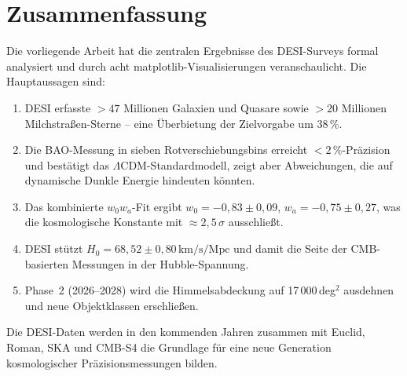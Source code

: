 ﻿\documentclass[a4paper,12pt]{article}
\theoremstyle{definition}
\theoremstyle{remark}
\begin{document}
\section{Zusammenfassung}
\label{sec:zusammenfassung}

Die vorliegende Arbeit hat die zentralen Ergebnisse des DESI-Surveys formal
analysiert und durch acht matplotlib-Visualisierungen veranschaulicht.
Die Hauptaussagen sind:

\begin{enumerate}[label=\arabic*.]
  \item DESI erfasste $>47$ Millionen Galaxien und Quasare sowie $>20$ Millionen
    Milchstra\-ßen-Sterne -- eine Überbietung der Zielvorgabe um 38\,\%.
  \item Die BAO-Messung in sieben Rotverschiebungsbins erreicht $< 2\,\%$-Präzision
    und bestätigt das $\Lambda$CDM-Standardmodell, zeigt aber Abweichungen,
    die auf dynamische Dunkle Energie hindeuten könnten.
  \item Das kombinierte $w_0 w_a$-Fit ergibt $w_0 = -0{,}83 \pm 0{,}09$,
    $w_a = -0{,}75 \pm 0{,}27$, was die kosmologische Konstante mit
    $\approx 2{,}5\,\sigma$ ausschließt.
  \item DESI stützt $H_0 = 68{,}52 \pm 0{,}80\,\mathrm{km/s/Mpc}$ und damit
    die Seite der CMB-basierten Messungen in der Hubble-Spannung.
  \item Phase~2 (2026--2028) wird die Himmelsabdeckung auf 17\,000\,deg$^2$
    ausdehnen und neue Objektklassen erschließen.
\end{enumerate}

Die DESI-Daten werden in den kommenden Jahren zusammen mit Euclid, Roman,
SKA und CMB-S4 die Grundlage für eine neue Generation kosmologischer
Präzisionsmessungen bilden.
\end{document}
